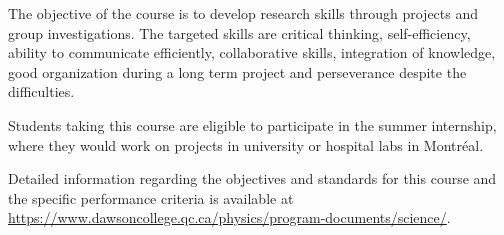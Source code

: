 {The objective of the course is to develop research skills through projects and group investigations. The targeted skills are critical thinking, self-efficiency, ability to communicate efficiently, collaborative skills, integration of knowledge, good organization during a long term project and perseverance despite the difficulties.
\smallskip

Students taking this course are eligible to participate in the summer internship, where they would work on projects in university or hospital labs in Montréal.

Detailed information regarding the objectives and standards for this course and the specific performance criteria is available at \url{https://www.dawsoncollege.qc.ca/physics/program-documents/science/}.}
